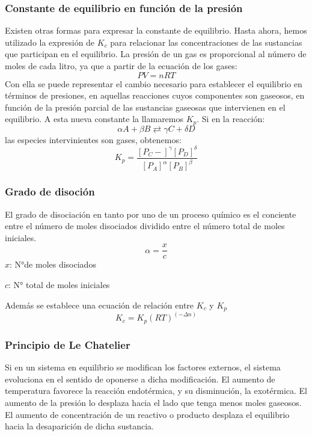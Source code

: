 \documentclass[11pt]{article}
\begin{document}
    \subsubsection{Constante de equilibrio en funci\'on de la presi\'on}
        Existen otras formas para expresar la constante de equilibrio. Hasta ahora, hemos utilizado la expresión de $K_c$ para relacionar las concentraciones de las sustancias que participan en el equilibrio.
        La presión de un gas es proporcional al número de moles de cada litro, ya que a partir de la ecuación de los gases:
        \begin{equation*}
            PV = nRT
        \end{equation*}
        Con ella se puede representar el cambio necesario para establecer el equilibrio en términos de presiones, en aquellas reacciones cuyos componentes son gaseosos, en función de la presión parcial de las sustancias gaseosas que intervienen en el equilibrio. A esta nueva constante la llamaremos $K_p$. Si en la reacción:
        \begin{equation*}
            \alpha A + \beta B \rightleftarrows  \gamma C + \delta D
        \end{equation*}
        las especies intervinientes son gases, obtenemos:
        \begin{equation*}
            K_p  = \frac{[P_C-]^\gamma[P_D]^\delta}{[P_A]^\alpha[P_B]^\beta} 
        \end{equation*}
    \subsubsection{Grado de disoci\'on}
        El grado de disociación en tanto por uno de un proceso químico es el conciente entre el número de moles disociados dividido entre el número total de moles iniciales.
        \begin{equation*}
            \alpha = \frac{x}{c}
        \end{equation*}
        $x$: N°de moles disociados

        $c$: N° total de moles iniciales

        Además se establece una ecuación de relación entre $K_c$ y $K_p$
        \begin{equation*}
            K_c = K_p(RT)^(-\Delta n)
        \end{equation*}
    \subsubsection{Principio de Le Chatelier}
        Si en un sistema en equilibrio se modifican los factores externos, el sistema evoluciona en el sentido de oponerse a dicha modificación. El aumento de temperatura favorece la reacción endotérmica, y su disminución, la exotérmica. El aumento de la presión lo desplaza hacia el lado que tenga menos moles gaseosos. El aumento de concentración de un reactivo o producto desplaza el equilibrio hacia la desaparición de dicha sustancia.
\end{document}
